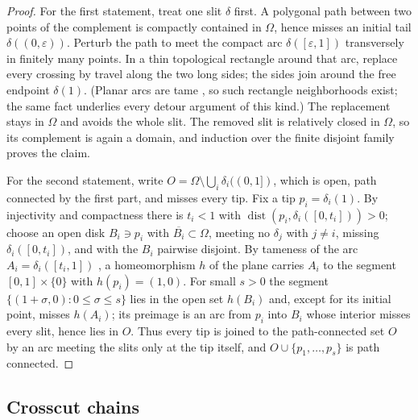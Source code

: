 \documentclass[11pt,reqno]{amsart}
\numberwithin{equation}{section}
\theoremstyle{plain}
\theoremstyle{definition}
\theoremstyle{remark}
\newcommand{\eps}{\varepsilon}
\begin{document}
\begin{proof}
For the first statement, treat one slit $\delta$ first.  A polygonal
path between two points of the complement is compactly contained in
$\Omega$, hence misses an initial tail $\delta((0,\eps))$.  Perturb the
path to meet the compact arc $\delta([\eps,1])$ transversely in finitely
many points.  In a thin topological rectangle around that arc, replace
every crossing by travel along the two long sides; the sides join around
the free endpoint $\delta(1)$.  (Planar arcs are tame \cite{Moise77}, so
such rectangle neighborhoods exist; the same fact underlies every detour
argument of this kind.)  The replacement stays in $\Omega$ and avoids
the whole slit.  The removed slit is relatively closed in $\Omega$, so
its complement is again a domain, and induction over the finite disjoint
family proves the claim.

For the second statement, write
$O=\Omega\setminus\bigcup_i\delta_i((0,1])$, which is open, path
connected by the first part, and misses every tip.  Fix a tip
$p_i=\delta_i(1)$.  By injectivity and compactness there is $t_i<1$
with $\operatorname{dist}(p_i,\delta_i([0,t_i]))>0$; choose an open
disk $B_i\ni p_i$ with $\overline{B_i}\subset\Omega$, meeting no
$\delta_j$ with $j\ne i$, missing $\delta_i([0,t_i])$, and with the
$B_i$ pairwise disjoint.  By tameness of the arc
$A_i=\delta_i([t_i,1])$ \cite{Moise77}, a homeomorphism $h$ of the
plane carries $A_i$ to the segment $[0,1]\times\{0\}$ with
$h(p_i)=(1,0)$.  For small $s>0$ the segment
$\{(1+\sigma,0):0\le\sigma\le s\}$ lies in the open set $h(B_i)$ and,
except for its initial point, misses $h(A_i)$; its preimage is an arc
from $p_i$ into $B_i$ whose interior misses every slit, hence lies in
$O$.  Thus every tip is joined to the path-connected set $O$ by an arc
meeting the slits only at the tip itself, and
$O\cup\{p_1,\ldots,p_s\}$ is path connected.
\end{proof}

\subsection{Crosscut chains}
\label{sec:crosscut-conventions}
\end{document}
